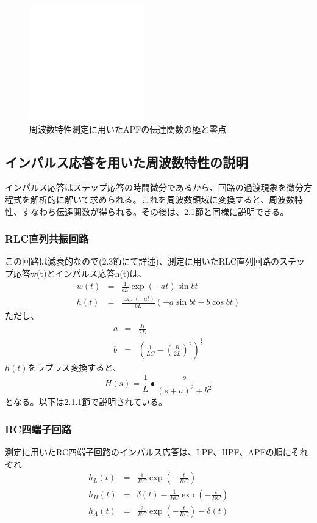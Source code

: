 \documentclass[10pt,a4j,dvipdfmx]{jsarticle}
\begin{document}
\begin{figure}[H]
  \centering
  \includegraphics[width=5cm]{token.png}
  \caption{周波数特性測定に用いたAPFの伝達関数の極と零点}
\end{figure}

\subsection{インパルス応答を用いた周波数特性の説明}
インパルス応答はステップ応答の時間微分であるから、回路の過渡現象を微分方程式を解析的に解いて求められる。これを周波数領域に変換すると、周波数特性、すなわち伝達関数が得られる。その後は、2.1節と同様に説明できる。

\subsubsection{RLC直列共振回路}
この回路は減衰的なので(2.3節にて詳述)、測定に用いたRLC直列回路のステップ応答w(t)とインパルス応答h(t)は、
\begin{eqnarray}
w(t) &=& \frac{1}{bL} \exp(-at)\sin bt \\
h(t) &=& \frac{\exp(-at)}{bL}\left( -a\sin bt + b\cos bt\right)
\end{eqnarray}
ただし、
\begin{eqnarray}
a &=& \frac{R}{2L} \\
b &=& \left( \frac{1}{LC}-\left(\frac{R}{2L}\right)^2\right)^{\frac{1}{2}}
\end{eqnarray}
$h(t)$をラプラス変換すると、
\begin{equation}
H\left(s\right) = \frac{1}{L}\bullet\frac{s}{\left(s+a\right)^{2}+b^{2}}
\end{equation}
となる。以下は2.1.1節で説明されている。

\subsubsection{RC四端子回路}
測定に用いたRC四端子回路のインパルス応答は、LPF、HPF、APFの順にそれぞれ
\begin{eqnarray}
h_{L}\left(t\right) &=& \frac{1}{RC}\exp(-\frac{t}{RC}) \\
h_{H}\left(t\right) &=& \delta(t) - \frac{1}{RC}\exp(-\frac{t}{RC}) \\
h_{A}\left(t\right) &=& \frac{2}{RC}\exp(-\frac{t}{RC}) - \delta(t)
\end{eqnarray}
\end{document}
